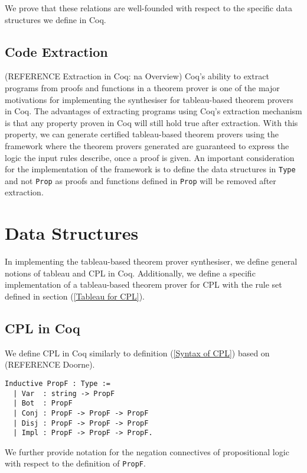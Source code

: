 \documentclass{llncs}
\begin{document}
We prove that these relations are well-founded with respect to the specific
data structures we define in Coq.

\subsection{Code Extraction}

(REFERENCE Extraction in Coq: na Overview)
Coq's ability to extract programs from proofs and functions in a theorem prover
is one of the major motivations for implementing the synthesiser for
tableau-based theorem provers in Coq. The advantages of extracting programs
using Coq's extraction mechanism is that any property proven in Coq will still
hold true after extraction. With this property, we can generate certified
tableau-based theorem provers using the framework where the theorem provers
generated are guaranteed to express the logic the input rules describe, once
a proof is given. An important consideration for the implementation of the
framework is to define the data structures in \verb+Type+ and not \verb+Prop+
as proofs and functions defined in \verb+Prop+ will be removed after
extraction.

\section{Data Structures}

In implementing the tableau-based theorem prover synthesiser, we define general
notions of tableau and CPL in Coq. Additionally, we define a specific
implementation of a tableau-based theorem prover for CPL with the rule set
defined in section (\ref{Tableau for CPL}).

\subsection{CPL in Coq}

We define CPL in Coq similarly to definition (\ref{Syntax of CPL}) based on
(REFERENCE Doorne).

\begin{verbatim}
Inductive PropF : Type :=
  | Var  : string -> PropF
  | Bot  : PropF
  | Conj : PropF -> PropF -> PropF
  | Disj : PropF -> PropF -> PropF
  | Impl : PropF -> PropF -> PropF.
\end{verbatim}

We further provide notation for the negation connectives of propositional
logic with respect to the definition of \verb+PropF+.
\end{document}
